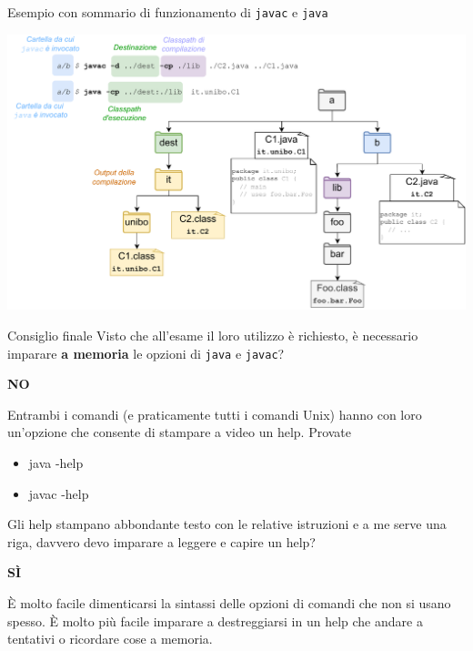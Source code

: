 \documentclass[xcolor=dvipsnames,presentation]{beamer}
\begin{document}
\begin{frame}{Esempio con sommario di funzionamento di \texttt{javac} e \texttt{java}}

\includegraphics[width=\textwidth]{img/java-javac.drawio.pdf}

\end{frame}

\begin{frame}{Consiglio finale}
  Visto che all'esame il loro utilizzo è richiesto, è necessario imparare \textbf{a memoria} le opzioni di \texttt{java} e \texttt{javac}?
  \begin{center}
    \textbf{NO}
  \end{center}
  Entrambi i comandi (e praticamente tutti i comandi Unix) hanno con loro un'opzione che consente di stampare a video un help. Provate
  \begin{block}{}
    \begin{itemize}
      \item java -help
      \item javac -help
    \end{itemize}
  \end{block}
  \vspace{10pt}

  Gli help stampano abbondante testo con le relative istruzioni e a me serve una riga, davvero devo imparare a leggere e capire un help?
  \begin{center}
    \textbf{SÌ}
  \end{center}
  È molto facile dimenticarsi la sintassi delle opzioni di comandi che non si usano spesso. È molto più facile imparare a destreggiarsi in un help che andare a tentativi o ricordare cose a memoria.
\end{frame}
\end{document}
